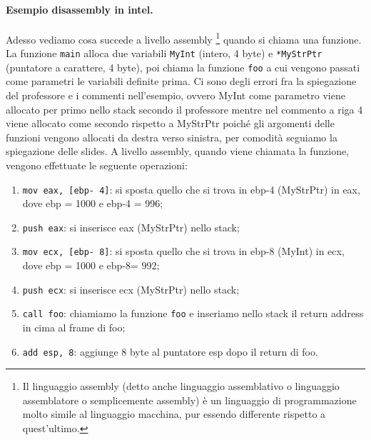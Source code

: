 \paragraph{Esempio disassembly in intel.} Adesso vediamo cosa succede a livello assembly
\footnote{Il linguaggio assembly (detto anche linguaggio assemblativo o linguaggio
    assemblatore o semplicemente assembly) è un linguaggio di programmazione molto simile al
    linguaggio macchina, pur essendo differente rispetto a quest'ultimo.} quando si
chiama una funzione. La funzione \verb|main| alloca due variabili \verb|MyInt|
(intero, 4 byte) e \verb|*MyStrPtr| (puntatore a carattere, 4 byte), poi chiama la
funzione \verb|foo| a cui vengono passati come parametri le variabili definite prima.
Ci sono degli errori fra la spiegazione del professore e i commenti nell'esempio,
ovvero MyInt come parametro viene allocato per primo nello stack secondo il professore
mentre nel commento a riga 4 viene allocato come secondo rispetto a MyStrPtr poiché gli
argomenti delle funzioni vengono allocati da destra verso sinistra, per comodità seguiamo
la spiegazione delle slides.
A livello assembly, quando viene chiamata la funzione, vengono effettuate le seguente operazioni:

\begin{enumerate}
    \item  \verb|mov eax, [ebp- 4]|: si sposta quello che si trova in ebp-4 (MyStrPtr)
          in eax, dove ebp = 1000 e ebp-4 = 996;
    \item \verb|push eax|: si inserisce eax (MyStrPtr) nello stack;
    \item  \verb|mov ecx, [ebp- 8]|: si sposta quello che si trova in
          ebp-8 (MyInt) in ecx,  dove ebp = 1000 e ebp-8= 992;
    \item \verb|push ecx|: si inserisce ecx (MyStrPtr) nello stack;
    \item \verb|call foo|: chiamiamo la funzione \verb|foo| e inseriamo nello stack
          il return address in cima al frame di foo;
    \item \verb|add esp, 8|: aggiunge 8 byte al puntatore esp dopo il return di foo.
\end{enumerate}

